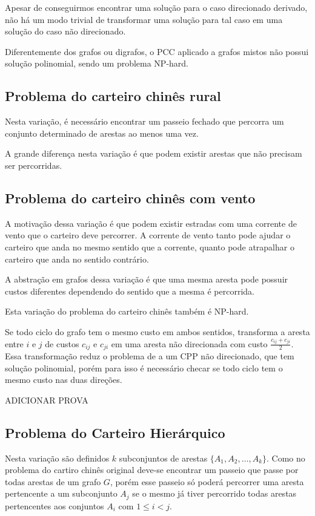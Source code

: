 \documentclass[12pt, a4paper]{article}
\begin{document}
    Apesar de conseguirmos encontrar uma solução para o caso direcionado derivado, não há um modo trivial de transformar uma solução para tal caso em uma solução do caso não direcionado.

    Diferentemente dos grafos ou digrafos, o PCC aplicado a grafos mistos não possui solução polinomial, sendo um problema NP-hard. 

    \subsection{Problema do carteiro chinês rural}
        Nesta variação, é necessário encontrar um passeio fechado que percorra um conjunto determinado de arestas ao menos uma vez.

        A grande diferença nesta variação é que podem existir arestas que não precisam ser percorridas.


    \subsection{Problema do carteiro chinês com vento}
        A motivação dessa variação é que podem existir estradas com uma corrente de vento que o carteiro deve percorrer. A corrente de vento tanto pode ajudar o carteiro que anda no mesmo sentido que a corrente, quanto pode atrapalhar o carteiro que anda no sentido contrário.

        A abstração em grafos dessa variação é que uma mesma aresta pode possuir custos diferentes dependendo do sentido que a mesma é percorrida.

        Esta variação do problema do carteiro chinês também é NP-hard.
        

        Se todo ciclo do grafo tem o mesmo custo em ambos sentidos, transforma a aresta entre $i$ e $j$ de custos $c_{ij}$ e $c_{ji}$ em uma aresta não direcionada com custo $\frac{c_{ij} + c_{ji}}{2}$. Essa transformação reduz o problema de a um CPP não direcionado, que tem solução polinomial, porém para isso é necessário checar se todo ciclo tem o mesmo custo nas duas direções.

        ADICIONAR PROVA

    \subsection{Problema do Carteiro Hierárquico}

    Nesta variação são definidos $k$ subconjuntos de arestas $\{A_1, A_2, \dots, A_k\}$.
    Como no problema do cartiro chinês original deve-se encontrar um passeio que passe por todas arestas de um grafo $G$, porém esse passeio só poderá percorrer uma aresta pertencente a um subconjunto $A_j$ se o mesmo já tiver percorrido todas arestas pertencentes aos conjuntos $A_i$ com $1 \leq i < j$.
\end{document}
